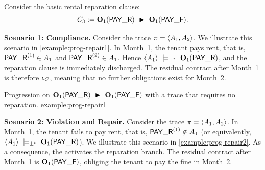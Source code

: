 \begin{example}
\label{ex:prog-repit}
Consider the basic rental reparation clause:
\[ C_3 := \obl[1]{\PAY}\ \repair\ \obl[1]{\PAYF}. \]


\noindent\textbf{Scenario 1: Compliance.}
Consider the trace $\pi=\trace{A_1,A_2}$. We illustrate this scenario in \ref{example:prog-repair1}.
In Month~1, the tenant pays rent, that is,
$\PAY^{(1)}\in A_1$ and $\PAY^{(2)}\in A_1$.
Hence $\trace{A_1}\ \satt\ \obl[1]{\PAY}$, and the reparation clause is immediately discharged.
The residual contract after Month~1 is therefore $\emptc$, meaning that no further obligations exist for Month~2.

    {Progression on $ \obl[1]{\PAY}\ \repair\ \obl[1]{\PAYF}$ with a trace that requires no reparation.}
    {example:prog-repair1}
    {\vspace{8pt}}{\vspace{-12pt}}

\medskip
\noindent\textbf{Scenario 2: Violation and Repair.}
Consider the trace $\pi=\trace{A_1,A_2}$.
In Month~1, the tenant fails to pay rent, that is,
$\PAY^{(1)}\notin A_1$ (or equivalently, $\trace{A_1}\ \violt\ \obl[1]{\PAY}$). We illustrate this scenario in \ref{example:prog-repair2}.
As a consequence, the \CPM activates the reparation branch.
The residual contract after Month~1 is $\obl[1]{\PAYF}$, obliging the tenant to pay the fine in Month~2.


\end{example}
